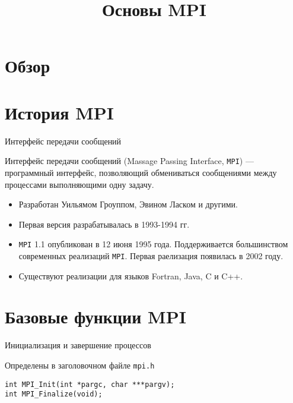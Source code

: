 

\title{Основы MPI}



\begin{frame}
\titlepage
\end{frame}

\section{Обзор}

\begin{frame}
\tableofcontents
\end{frame} 

\section{История MPI}

\begin{frame}{Интерфейс передачи сообщений}

Интерфейс передачи сообщений (\abbr Massage Passing Interface, \texttt{MPI}) --- программный интерфейс, позволяющий обмениваться сообщениями между процессами выполняющими одну задачу.

\begin{itemize}
    \item Разработан Уильямом Гроуппом, Эвином Ласком и другими.
    \item Первая версия разрабатывалась в 1993-1994 гг.
    \item \texttt{MPI} 1.1 опубликован в 12 июня 1995 года. Поддерживается большинством современных реализаций \texttt{MPI}. Первая раелизация появилась в 2002 году.
    \item Существуют реализации для языков Fortran, Java, C и C++.
\end{itemize}

\end{frame}

\section{Базовые функции MPI}

\begin{frame}[fragile]{Инициализация и завершение процессов}

Определены в заголовочном файле \texttt{mpi.h}

\vfill

\begin{lstlisting}
int MPI_Init(int *pargc, char ***pargv);
int MPI_Finalize(void);
\end{lstlisting}

\end{frame}

